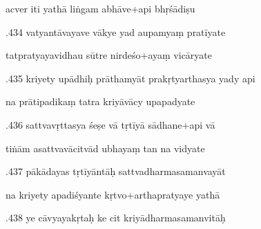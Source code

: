 \documentclass[article,12pt,a4paper]{memoir}%
\newcounter{parCount}
\begin{document}
	  
	  \pstart \leavevmode%
	acver iti yathā liṅgam abhāve+api bhṛśādiṣu 
	{}
	\pend%
      

	  
	  \pstart {}.434 vatyantāvayave vākye yad aupamyaṃ pratīyate 
	{}
	\pend%
      

	  
	  \pstart \leavevmode%
	tatpratyayavidhau sūtre nirdeśo+ayaṃ vicāryate 
	{}
	\pend%
      

	  
	  \pstart {}.435 kriyety upādhiḥ prāthamyāt prakṛtyarthasya yady api 
	{}
	\pend%
      

	  
	  \pstart \leavevmode%
	na prātipadikaṃ tatra kriyāvācy upapadyate 
	{}
	\pend%
      

	  
	  \pstart {}.436 sattvavṛttasya śeṣe vā tṛtīyā sādhane+api vā 
	{}
	\pend%
      

	  
	  \pstart \leavevmode%
	tiṅām asattvavācitvād ubhayaṃ tan na vidyate 
	{}
	\pend%
      

	  
	  \pstart {}.437 pākādayas tṛtīyāntāḥ   sattvadharmasamanvayāt 
	{}
	\pend%
      

	  
	  \pstart \leavevmode%
	na kriyety apadiśyante kṛtvo+arthapratyaye yathā 
	{}
	\pend%
      

	  
	  \pstart {}.438 ye cāvyayakṛtaḥ ke cit   kriyādharmasamanvitāḥ 
	{}
	\pend%
      
\end{document}
